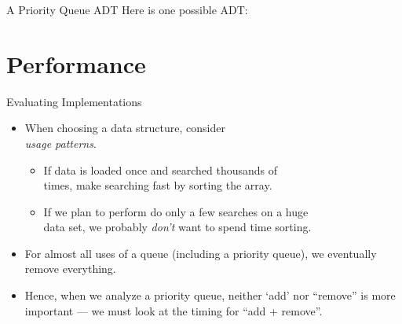\documentclass[14pt, aspectratio=1610]{beamer}
\begin{document}
\begin{frame}{A Priority Queue ADT}
Here is one possible ADT\@:
\renewcommand{\arraystretch}{1.25}
\end{frame}



\setbeamercovered{}

\section{Performance}

\begin{frame}{Evaluating Implementations}
\begin{itemize}[<+->]
\item
  When choosing a data structure, consider \\\emph{usage patterns}.
  \begin{itemize}
  \item
    If data is loaded once and searched thousands of\\
    times, make searching fast by sorting the array.
  \item
    If we plan to perform do only a few searches on a huge\\ data set, we probably \emph{don't} want to spend time sorting.
  \end{itemize}
\item
  For almost all uses of a queue (including a priority queue), we eventually remove everything.
\item
  Hence, when we analyze a priority queue, neither `add' nor ``remove'' is more important --- we must look at the timing for ``add + remove''.

\end{itemize}
\end{frame}
\end{document}
